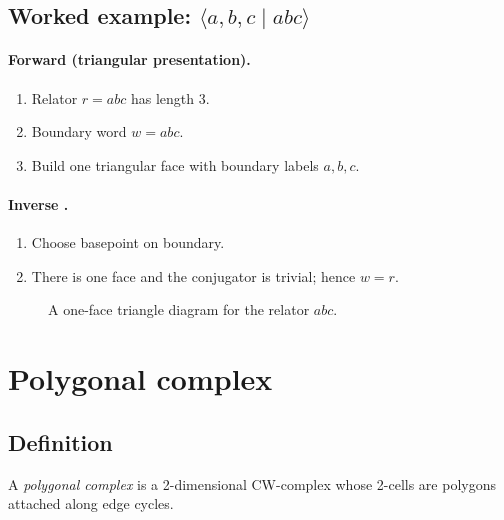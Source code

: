\documentclass[11pt]{article}
\theoremstyle{definition}
\theoremstyle{plain}
\theoremstyle{remark}
\begin{document}
\subsection*{Worked example: $\langle a,b,c\mid abc\rangle$}
\paragraph{Forward (triangular presentation).}
\begin{enumerate}[leftmargin=2.2em]
\item Relator $r=abc$ has length $3$.
\item Boundary word $w=abc$.
\item Build one triangular face with boundary labels $a,b,c$.
\end{enumerate}

\paragraph{Inverse .}
\begin{enumerate}[leftmargin=2.2em]
\item Choose basepoint on boundary.
\item There is one face and the conjugator is trivial; hence $w=r$.
\end{enumerate}

\begin{figure}[h]
\centering
{}
\caption{A one-face triangle diagram for the relator $abc$.}
\end{figure}

\section{Polygonal complex}

\subsection*{Definition}
A \emph{polygonal complex} is a 2-dimensional CW-complex whose 2-cells are polygons attached along edge cycles.
\end{document}
